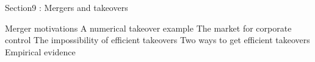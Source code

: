 

Section9 : Mergers and takeovers

Merger motivations
A numerical takeover example
The market for corporate control
The impossibility of efficient takeovers
Two ways to get efficient takeovers
Empirical evidence


